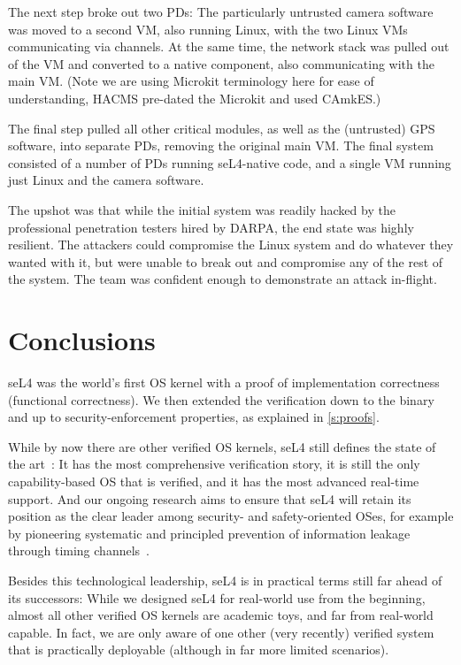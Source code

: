 \documentclass[english,a4paper,12pt]{report}
\newcommand{\Sect}[1]{\section{#1}}
\newcommand{\Sect}[1]{\chapter{#1}}
\begin{document}
  The next step broke out two PDs: The particularly untrusted
  camera software was moved to a second VM, also running Linux, with
  the two Linux VMs communicating via channels. At the same
  time, the network stack was pulled out of the VM and converted to a
  native component, also communicating with the main VM. (Note we are
  using Microkit terminology here for ease of understanding, HACMS
  pre-dated the Microkit and used CAmkES.)

  The final step pulled all other critical modules, as well as the
  (untrusted) GPS software, into separate PDs, removing
  the original main VM. The final system consisted of a number of
  PDs running seL4-native code, and a single VM running
  just Linux and the camera software.

  The upshot was that while the initial system was readily hacked by
  the professional penetration testers hired by DARPA, the end state was highly
  resilient. The attackers could compromise the Linux system and do
  whatever they wanted with it, but were unable to break out and
  compromise any of the rest of the system. The team was confident
  enough to demonstrate an attack in-flight.

  \Sect{\label{s:concl}Conclusions}

  seL4 was the world's first OS kernel with a proof of implementation
  correctness (functional correctness). We then extended the
  verification down to the
  binary and up to security-enforcement properties, as explained in
  \autoref{s:proofs}.

  While by now there are other verified OS kernels, seL4 still defines
  the state of the art~\citep{Heiser:10y-blog}: It has the most
  comprehensive verification story, it is still the only
  capability-based OS that is verified, and it has the most advanced
  real-time support. And our ongoing research aims to ensure that
  seL4 will retain its position as the clear leader among security-
  and safety-oriented OSes, for example by pioneering systematic and
  principled prevention of information leakage through timing
  channels~\citep{Ge_YCH_19}.

  Besides this technological leadership, seL4 is in practical terms
  still far ahead of its successors: While we designed seL4 for
  real-world use from the beginning, almost all other verified OS
  kernels are academic toys, and far from real-world capable. In fact, we
  are only aware of one other (very recently) verified system that is
  practically deployable (although in far more limited scenarios).
\end{document}
